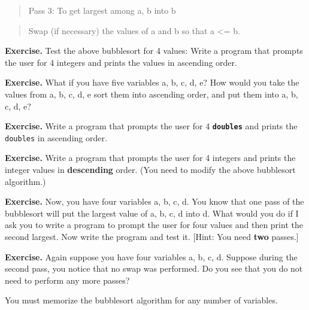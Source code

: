 \begin{quote}
Pass 3: To get largest among a, b into b
\end{quote}
\begin{tightlist}
\li
  \begin{quote}
  Swap (if necessary) the values of a and b so that a <= b.
  \end{quote}
\end{tightlist}

\textbf{Exercise. }Test the above bubblesort for 4 values: Write a
program that prompts the user for 4 integers and prints the values in
ascending order.

\textbf{Exercise. }What if you have five variables a, b, c, d, e? How
would you take the values from a, b, c, d, e sort them into ascending
order, and put them into a, b, c, d, e?

\textbf{Exercise.} Write a program that prompts the user for 4
\texttt{\textbf{doubles}} and prints the \texttt{doubles} in ascending order.

\textbf{Exercise. }Write a program that prompts the user for 4 integers
and prints the integer values in \textbf{descending} order. (You need to
modify the above bubblesort algorithm.)

\textbf{Exercise.} Now, you have four variables a, b, c, d. You know
that one pass of the bubblesort will put the largest value of a, b, c, d
into d. What would you do if I ask you to write a program to prompt the
user for four values and then print the second largest. Now write the
program and test it. [Hint: You need \textbf{two} passes.]

\textbf{Exercise.} Again suppose you have four variables a, b, c, d.
Suppose during the second pass, you notice that no swap was performed.
Do you see that you do not need to perform any more passes?

You must memorize the bubblesort algorithm for any number of variables.
